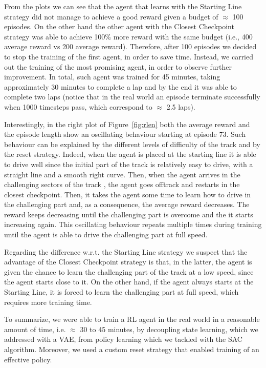 From the plots we can see that the agent that learns with the Starting Line strategy did not manage to achieve a good reward given a budget of $\approx$ 100 episodes. On the other hand the other agent with the Closest Checkpoint strategy was able to achieve 100\% more reward with the same budget (i.e., 400 average reward vs 200 average reward). Therefore, after 100 episodes we decided to stop the training of the first agent, in order to save time. Instead, we carried out the training of the most promising agent, in order to observe further improvement. In total, such agent was trained for 45 minutes, taking approximately 30 minutes to complete a lap and by the end it was able to complete two laps (notice that in the real world an episode terminate successfully when 1000 timesteps pass, which correspond to $\approx$ 2.5 laps).

Interestingly, in the right plot of Figure~\ref{fig:rlen} both the average reward and the episode length show an oscillating behaviour starting at episode 73. Such behaviour can be explained by the different levels of difficulty of the track and by the reset strategy. Indeed, when the agent is placed at the starting line it is able to drive well since the initial part of the track is relatively easy to drive, with a straight line and a smooth right curve. Then, when the agent arrives in the challenging sectors of the track , the agent goes offtrack and restarts in the closest checkpoint. Then, it takes the agent some time to learn how to drive in the challenging part and, as a consequence, the average reward decreases. The reward keeps decreasing until the challenging part is overcome and the it starts increasing again. This oscillating behaviour repeats multiple times during training until the agent is able to drive the challenging part at full speed.

Regarding the difference w.r.t. the Starting Line strategy we suspect that the advantage of the Closest Checkpoint strategy is that, in the latter, the agent is given the chance to learn the challenging part of the track at a low speed, since the agent starts close to it. On the other hand, if the agent always starts at the Starting Line, it is forced to learn the challenging part at full speed, which requires more training time.

To summarize, we were able to train a RL agent in the real world in a reasonable amount of time, i.e. $\approx$ 30 to 45 minutes, by decoupling state learning, which we addressed with a VAE, from policy learning which we tackled with the SAC algorithm. Moreover, we used a custom reset strategy that enabled training of an effective policy.

